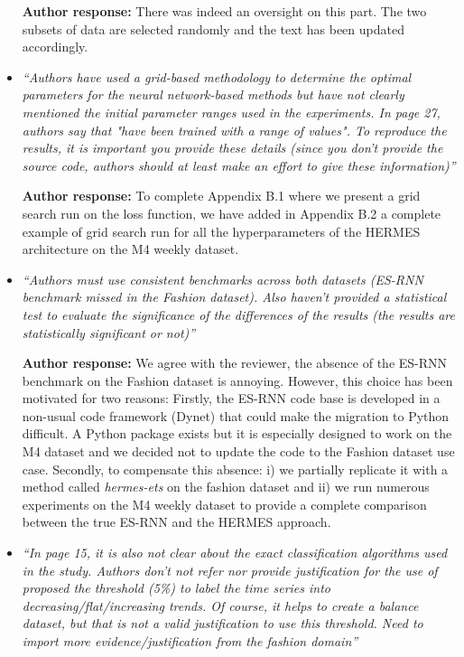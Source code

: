 \documentclass[11pt]{article}
\begin{document}
\begin{itemize}
\textbf{Author response:} There was indeed an oversight on this part. The two subsets of data are selected randomly and the text has been updated accordingly. 

\item {\em ``Authors have used a grid-based methodology to determine the optimal parameters for the neural network-based methods but have not clearly mentioned the initial parameter ranges used in the experiments. In page 27, authors say that "have been trained with a range of values". To reproduce the results, it is important you provide these details (since you don't provide the source code, authors should at least make an effort to give these information)''} \medskip

\textbf{Author response:}  To complete Appendix B.1 where we present a grid search run on the loss function, we have added in Appendix B.2 a complete example of grid search run for all the hyperparameters of the HERMES architecture on the M4 weekly dataset.

\item {\em ``Authors must use consistent benchmarks across both datasets (ES-RNN benchmark missed in the Fashion dataset). Also haven't provided a statistical test to evaluate the significance of the differences of the results (the results are statistically significant or not)''} \medskip

\textbf{Author response:} We agree with the reviewer, the absence of the ES-RNN benchmark on the Fashion dataset is annoying. However, this choice has been motivated for two reasons: Firstly, the ES-RNN code base is developed in a non-usual code framework (Dynet) that could make the migration to Python difficult. A Python package exists but it is especially designed to work on the M4 dataset and we decided not to update the code to the Fashion dataset use case. Secondly, to compensate this absence: i) we partially replicate it with a method called \textit{hermes-ets} on the fashion dataset and ii) we run numerous experiments on the M4 weekly dataset to provide a complete comparison between the true ES-RNN and the HERMES approach.

\item {\em ``In page 15, it is also not clear about the exact classification algorithms used in the study. Authors don't not refer nor provide justification for the use of proposed the threshold (5\%) to label the time series into decreasing/flat/increasing trends. Of course, it helps to create a balance dataset, but that is not a valid justification to use this threshold. Need to import more evidence/justification from the fashion domain''} \medskip


\end{itemize}
\end{document}
